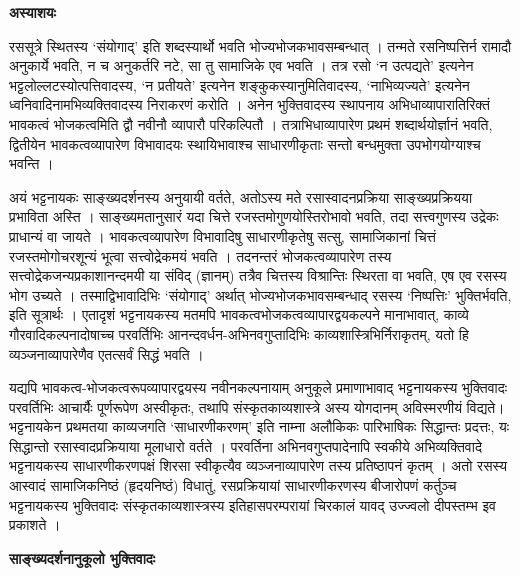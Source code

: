 \documentclass[10pt, a5paper, twoside]{article}
\newcommand{\customparagraph}[1]{
    \noindent \textbf{#1} \par
    \penalty 10000 %
    \vspace{0.1cm plus 0.05cm minus 0.02cm}
    \penalty 10000 %
}
\begin{document}
\customparagraph{\textbf{अस्याशयः}}

रससूत्रे स्थितस्य `संयोगाद्' इति शब्दस्यार्थो भवति भोज्यभोजकभावसम्बन्धात् । तन्मते रसनिष्पत्तिर्न रामादौ अनुकार्ये भवति, न च अनुकर्तरि नटे, सा तु सामाजिके एव भवति । तत्र रसो `न उत्पद्यते' इत्यनेन भट्टलोल्लटस्योत्पत्तिवादस्य, `न प्रतीयते' इत्यनेन शङ्कुकस्यानुमितिवादस्य, `नाभिव्यज्यते' इत्यनेन ध्वनिवादिनामभिव्यक्तिवादस्य निराकरणं करोति । अनेन भुक्तिवादस्य स्थापनाय अभिधाव्यापारातिरिक्तं भावकत्वं भोजकत्वमिति द्वौ नवीनौ व्यापारौ परिकल्पितौ । तत्राभिधाव्यापारेण प्रथमं शब्दार्थयोर्ज्ञानं भवति, द्वितीयेन भावकत्वव्यापारेण विभावादयः स्थायिभावाश्च साधारणीकृताः सन्तो बन्धमुक्ता उपभोगयोग्याश्च भवन्ति ।

अयं भट्टनायकः साङ्ख्यदर्शनस्य अनुयायी वर्तते, अतोऽस्य मते रसास्वादनप्रक्रिया साङ्ख्यप्रक्रियया प्रभाविता अस्ति । साङ्ख्यमतानुसारं यदा चित्ते रजस्तमोगुणयोस्तिरोभावो भवति, तदा सत्त्वगुणस्य उद्रेकः प्राधान्यं वा जायते । भावकत्वव्यापारेण विभावादिषु साधारणीकृतेषु सत्सु, सामाजिकानां चित्तं रजस्तमोगोचरशून्यं भूत्वा सत्त्वोद्रेकमयं भवति । तदनन्तरं भोजकत्वव्यापारेण तस्य सत्त्वोद्रेकजन्यप्रकाशानन्दमयी या संविद् (ज्ञानम्) तत्रैव चित्तस्य विश्रान्तिः स्थिरता वा भवति, एष एव रसस्य भोग उच्यते । तस्माद्विभावादिभिः `संयोगाद्' अर्थात् भोज्यभोजकभावसम्बन्धाद् रसस्य `निष्पत्तिः' भुक्तिर्भवति, इति सूत्रार्थः । एतादृशं भट्टनायकस्य मतमपि भावकत्वभोजकत्वव्यापारद्वयकल्पने मानाभावात्, काव्ये गौरवादिकल्पनादोषाच्च परवर्तिभिः आनन्दवर्धन-अभिनवगुप्तादिभिः काव्यशास्त्रिभिर्निराकृतम्, यतो हि व्यञ्जनाव्यापारेणैव एतत्सर्वं सिद्धं भवति ।

यद्यपि भावकत्व-भोजकत्वरूपव्यापारद्वयस्य नवीनकल्पनायाम् अनुकूले प्रमाणाभावाद् भट्टनायकस्य भुक्तिवादः परवर्तिभिः आचार्यैः पूर्णरूपेण अस्वीकृतः, तथापि संस्कृतकाव्यशास्त्रे अस्य योगदानम् अविस्मरणीयं विद्यते। भट्टनायकेन प्रथमतया काव्यजगति `साधारणीकरणम्' इति नाम्ना अलौकिकः पारिभाषिकः सिद्धान्तः प्रदत्तः, यः सिद्धान्तो रसास्वादप्रक्रियाया मूलाधारो वर्तते । परवर्तिना अभिनवगुप्तपादेनापि स्वकीये अभिव्यक्तिवादे भट्टनायकस्य साधारणीकरणपक्षं शिरसा स्वीकृत्यैव व्यञ्जनाव्यापारेण तस्य प्रतिष्ठापनं कृतम् । अतो रसस्य आस्वादं सामाजिकनिष्ठं (हृदयनिष्ठं) विधातुं, रसप्रक्रियायां साधारणीकरणस्य बीजारोपणं कर्तुञ्च भट्टनायकस्य भुक्तिवादः संस्कृतकाव्यशास्त्रस्य इतिहासपरम्परायां चिरकालं यावद् उज्ज्वलो दीपस्तम्भ इव प्रकाशते ।

\customparagraph{\textbf{साङ्‌ख्यदर्शनानुकूलो भुक्तिवादः}}
\end{document}

